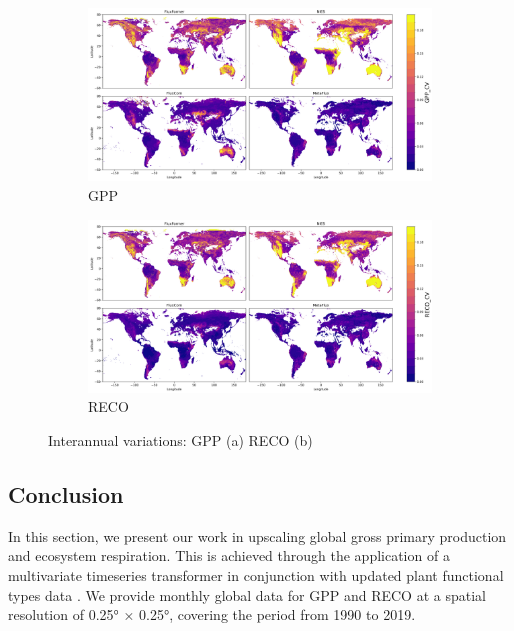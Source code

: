\begin{figure}[tbh!]
    \centering
    \begin{subfigure}{\textwidth}
      \centering
      \includegraphics[width=\textwidth]{figs/chap6/IAV_GPP.png}
      \caption{GPP}
      \label{fig:chap6_fig8a}
    \end{subfigure}

    \begin{subfigure}{\textwidth}
      \centering
      \includegraphics[width=\textwidth]{figs/chap6/IAV_RECO.png}
      \caption{RECO}
      \label{fig:chap6_fig8b}
    \end{subfigure}
    \caption{Interannual variations: GPP (a) RECO (b)}
    \label{fig:chap6_fig8}
\end{figure}
\subsection{Conclusion}
In this section, we present our work in upscaling global gross primary production and ecosystem respiration. This is achieved through the application of a multivariate timeseries transformer \citep{zerveas2021transformer} in conjunction with updated plant functional types data \citep{harper202229}. We provide monthly global data for GPP and RECO at a spatial resolution of 0.25° × 0.25°, covering the period from 1990 to 2019. \par

